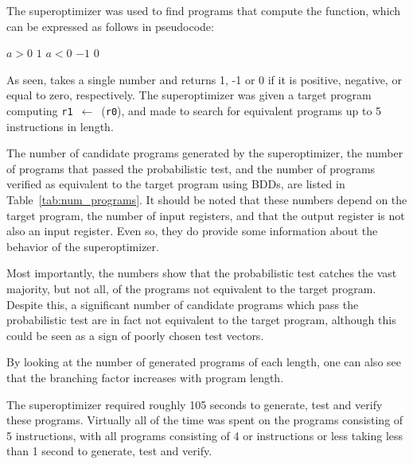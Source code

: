 \documentclass[a4paper,11pt]{kth-mag}
\renewcommand{\gets}{\leftarrow}
\begin{document}
The superoptimizer was used to find programs that compute the  function, which can be expressed as follows in pseudocode:

\begin{codebox}
\zi \If $a > 0$ \Do
\zi   \Return $1$ \End
\zi \If $a < 0$ \Do
\zi   \Return $-1$ \End
\zi \Return $0$
\end{codebox}

As seen,  takes a single number and returns 1, -1 or 0 if it is positive, negative, or equal to zero, respectively.
The superoptimizer was given a target program computing \verb|r1|~$\gets$~(\verb|r0|), and made to search for equivalent programs up to 5 instructions in length.

The number of candidate programs generated by the superoptimizer, the number of programs that passed the probabilistic test, and the number of programs verified as equivalent to the target program using BDDs, are listed in Table~\ref{tab:num_programs}.
It should be noted that these numbers depend on the target program, the number of input registers, and that the output register is not also an input register.
Even so, they do provide some information about the behavior of the superoptimizer.

Most importantly, the numbers show that the probabilistic test catches the vast majority, but not all, of the programs not equivalent to the target program.
Despite this, a significant number of candidate programs which pass the probabilistic test are in fact not equivalent to the target program, although this could be seen as a sign of poorly chosen test vectors.

By looking at the number of generated programs of each length, one can also see that the branching factor increases with program length.

The superoptimizer required roughly 105 seconds to generate, test and verify these programs.
Virtually all of the time was spent on the programs consisting of 5 instructions, with all programs consisting of 4 or instructions or less taking less than 1 second to generate, test and verify.
\end{document}
